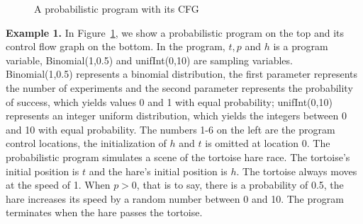 \documentclass[conference]{IEEEtran}
\begin{document}
\begin{figure}[htbp]
	\vspace{-0.1cm}  %
	\centering %
	\caption{A probabilistic program with its CFG} %
	\label{example1} %
\end{figure}

\textbf{Example 1.} In Figure~\ref{example1}, we show a probabilistic program on the top and its control flow graph on the bottom. In the program,  $t, p$ and $h$ is a program variable, Binomial(1,0.5) and unifInt(0,10) are sampling variables. Binomial(1,0.5) represents a binomial distribution, the first parameter represents the number of experiments and the second parameter represents the probability of success, which yields values 0 and 1 with equal probability; unifInt(0,10) represents an integer uniform distribution, which yields the integers between 0 and 10  with equal probability. The numbers 1-6 on the left are the program control locations, the initialization of $h$ and $t$ is omitted at location 0. The probabilistic program simulates a scene of the tortoise hare race. The tortoise's initial position is $t$ and the hare's initial position is $h$.  The tortoise  always moves at the speed of 1. When $p>0$, that is to say, there is a probability of 0.5, the hare increases its speed by a random number between 0 and 10. The program terminates when the hare passes the tortoise.
\end{document}
